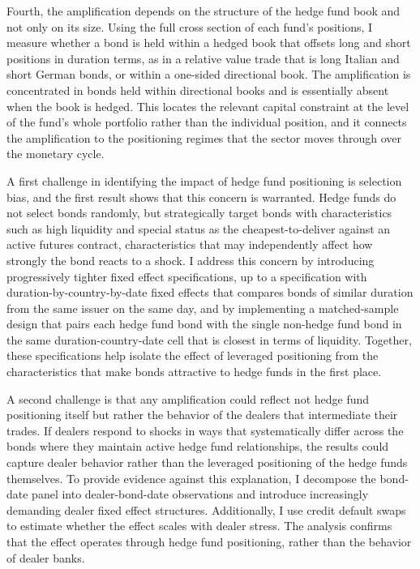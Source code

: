 \documentclass[english, 11pt, oneside]{article}
\begin{document}
Fourth, the amplification depends on the structure of the hedge fund book and not only on its size. Using the full cross section of each fund's positions, I measure whether a bond is held within a hedged book that offsets long and short positions in duration terms, as in a relative value trade that is long Italian and short German bonds, or within a one-sided directional book. The amplification is concentrated in bonds held within directional books and is essentially absent when the book is hedged. This locates the relevant capital constraint at the level of the fund's whole portfolio rather than the individual position, and it connects the amplification to the positioning regimes that the sector moves through over the monetary cycle.

A first challenge in identifying the impact of hedge fund positioning is selection bias, and the first result shows that this concern is warranted. Hedge funds do not select bonds randomly, but strategically target bonds with characteristics such as high liquidity and special status as the cheapest-to-deliver against an active futures contract, characteristics that may independently affect how strongly the bond reacts to a shock. I address this concern by introducing progressively tighter fixed effect specifications, up to a specification with duration-by-country-by-date fixed effects that compares bonds of similar duration from the same issuer on the same day, and by implementing a matched-sample design that pairs each hedge fund bond with the single non-hedge fund bond in the same duration-country-date cell that is closest in terms of liquidity. Together, these specifications help isolate the effect of leveraged positioning from the characteristics that make bonds attractive to hedge funds in the first place.

A second challenge is that any amplification could reflect not hedge fund positioning itself but rather the behavior of the dealers that intermediate their trades. If dealers respond to shocks in ways that systematically differ across the bonds where they maintain active hedge fund relationships, the results could capture dealer behavior rather than the leveraged positioning of the hedge funds themselves. To provide evidence against this explanation, I decompose the bond-date panel into dealer-bond-date observations and introduce increasingly demanding dealer fixed effect structures. Additionally, I use credit default swaps to estimate whether the effect scales with dealer stress. The analysis confirms that the effect operates through hedge fund positioning, rather than the behavior of dealer banks.
\end{document}
